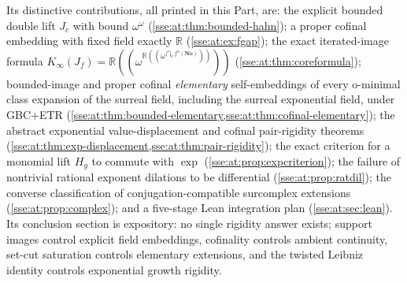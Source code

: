 \documentclass[11pt,a4paper]{article}
\numberwithin{equation}{section}
\theoremstyle{plain}
\theoremstyle{definition}
\theoremstyle{remark}
\newcommand{\No}{\mathbf{No}}
\newcommand{\R}{\mathbb{R}}
\newcommand{\NF}[1]{\R((\omega^{#1}))}
\begin{document}
Its distinctive contributions, all printed in this Part, are: the explicit
bounded double lift $J_c$ with bound $\omega^\omega$
(\cref{sse:at:thm:bounded-hahn}); a proper cofinal embedding with fixed field
exactly $\R$ (\cref{sse:at:ex:fgap}); the exact iterated-image formula
$K_\infty(J_f)=\NF{\NF{\bigcap_nf^n(\No)}}$ (\cref{sse:at:thm:coreformula});
bounded-image and proper cofinal \emph{elementary} self-embeddings of every
o-minimal class expansion of the surreal field, including the surreal
exponential field, under GBC+ETR
(\cref{sse:at:thm:bounded-elementary,sse:at:thm:cofinal-elementary}); the
abstract exponential value-displacement and cofinal pair-rigidity theorems
(\cref{sse:at:thm:exp-displacement,sse:at:thm:pair-rigidity}); the exact
criterion for a monomial lift $H_g$ to commute with $\exp$
(\cref{sse:at:prop:expcriterion}); the failure of nontrivial rational exponent
dilations to be differential (\cref{sse:at:prop:ratdil}); the converse
classification of conjugation-compatible surcomplex extensions
(\cref{sse:at:prop:complex}); and a five-stage Lean integration plan
(\cref{sse:at:sec:lean}). Its conclusion section is expository: no single
rigidity answer exists; support images control explicit field embeddings,
cofinality controls ambient continuity, set-cut saturation controls
elementary extensions, and the twisted Leibniz identity controls
exponential growth rigidity.
\end{document}
